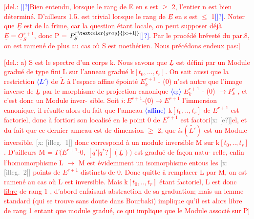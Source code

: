 \documentclass[11pt]{article}
\newcommand{\scanpage}[1]{\par\bigskip\noindent{\small\sffamily[scan #1]}\par}
\newcommand{\mspage}[1]{{\small\sffamily[p.\,#1]}}
\newcommand{\hand}[1]{\textcolor{blue}{#1}}
\newcommand{\inserted}[2][]{\textcolor{blue}{$\langle$#2$\rangle$}}
\newcommand{\deleted}[1]{\textcolor{red}{[\textsf{del.:} #1]}}
\newcommand{\xout}[1]{\textcolor{gray}{[\textsf{x:} #1]}}
\newcommand{\uline}[1]{\underline{#1}}
\newcommand{\unsure}[1]{[#1?]}
\newcommand{\illegible}[1]{[\textsf{illeg.\ #1}]}
\begin{document}
\deleted{\hand{\unsure{[}}Bien entendu, lorsque le rang de E en s est $\geq$ 2, l'entier n est bien
déterminé. D'ailleurs 1.5. est trivial lorsque le rang de $\underline{E}$ en s est $\leq$ 1\hand{\unsure{]}}.
Noter que $\underline{E}$ est de la frime, car la question étant locale, on peut supposer
déjà $\underline{E} = \underline{O}_S^{r+1}$, donc P = $P_S^{r\xout{+1}}$\hand{\unsure{]}}. Par le procédé bréveté du par.8, on est
ramené de plus au cas où S est noethérien. Nous précédons endeux pas:}

\deleted{a) S est le spectre d'un corps k. Nous savons que $\underline{L}$ est défini
par un Module gradué de type fini L sur l'anneau gradué k$[t_0,\ldots,t_r]$.
On sait aussi que la restriction \inserted{$L'$} de $\tilde{L}$ à l'espace affine épointé
$E_k^{r+1}$ - (0) n'est autre que l'image inverse de $\underline{L}$ par le morphisme de
projection canonique \inserted{q:} $E_k^{r+1}$ - (0) $\longrightarrow P_k^r$ , et c'est donc un Module inver-%
sible. Soit $i : E^{r+1}$-(0)$\to E^{r+1}$ l'immersion canonique, il résulte
alors du fait que l'anneau \inserted{affine} k$[t_0,..,t_r]$ de $E^{r+1}$ est factoriel, donc à
fortiori son localisé en le point 0 de $E^{r+1}$ est factori\xout{\unsure{e}}el, et du fait
que ce dernier anneau est de dimension $\geq$ 2, que $i_*(\tilde{L'})$ est un Module
inversible, \xout{\illegible{1}} donc correspond à un module inversible M sur
k$[t_0,..,t_r]$. D'ailleurs M = $\Gamma(E^{r+1}$-0, $\unsure{q'|q^*}(\underline{L}))$ est gradué de façon natu-%
relle, enfin l'homomorphisme L $\to$ M est évidemment un isomorphisme
entous les \xout{\illegible{2}} points de $E^{r+1}$ distincts de 0. Donc quitte à
remplacer L par M, on est ramené au cas où L est inversible. Mais
k$[t_0,..,t_r]$ étant factoriel, L est donc \uline{libre} de rang 1 , d'abord
enfaisant abstraction de sa graduation; mais un lemme standard (qui se
trouve sans doute dans Bourbaki) implique qu'il est alors libre de rang 1
entant que module gradué, ce qui implique que le Module associé sur P}

\mspage{100}

\clearpage
\scanpage{25/101}
\mspage{4}
\end{document}
